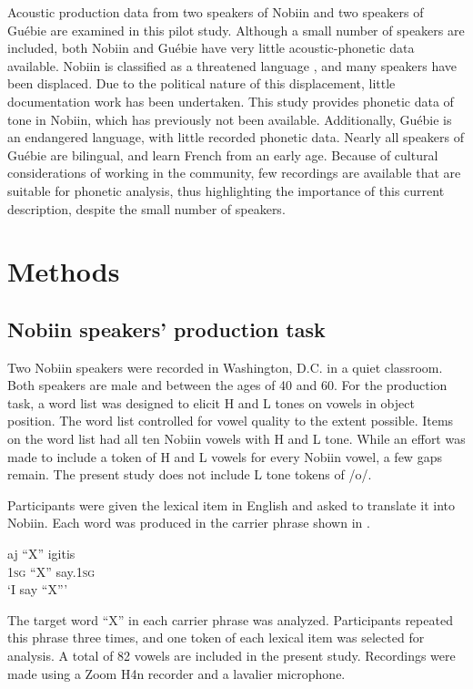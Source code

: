 \documentclass[output=paper]{langscibook}
\begin{document}
Acoustic production data from two speakers of Nobiin and two speakers of Guébie are examined in this pilot study. Although a small number of speakers are included, both Nobiin and Guébie have very little acoustic-phonetic data available. Nobiin is classified as a threatened language \citep{570887}, and many speakers have been displaced. Due to the political nature of this displacement, little documentation work has been undertaken. This study provides phonetic data of tone in Nobiin, which has previously not been available. Additionally, Guébie is an endangered language, with little recorded phonetic data. Nearly all speakers of Guébie are bilingual, and learn French from an early age. Because of cultural considerations of working in the community, few recordings are available that are suitable for phonetic analysis, thus highlighting the importance of this current description, despite the small number of speakers. 

\section{Methods}
\subsection{Nobiin speakers' production task} 

Two Nobiin speakers were recorded in Washington, D.C. in a quiet classroom. Both speakers are male and between the ages of 40 and 60. For the production task, a word list was designed to elicit H and L tones on vowels in object position. The word list controlled for vowel quality to the extent possible. Items on the word list had all ten Nobiin vowels with H and L tone. While an effort was made to include a token of H and L vowels for every Nobiin vowel, a few gaps remain. The present study does not include L tone tokens of /o/. 


Participants were given the lexical item in English and asked to translate it into Nobiin. Each word was produced in the carrier phrase shown in .


\ea \label{ex:oakley:NobiinCarrierPhrase}
\gll  aj “X” igitis\\
\textsc{1sg} “X” say.\textsc{1sg}\\
\glt  `I say “X”{}'
\z

The target word “X” in each carrier phrase was analyzed. Participants repeated this phrase three times, and one token of each lexical item was selected for analysis. A total of 82 vowels are included in the present study. Recordings were made using a Zoom H4n recorder and a lavalier microphone. 
\end{document}
